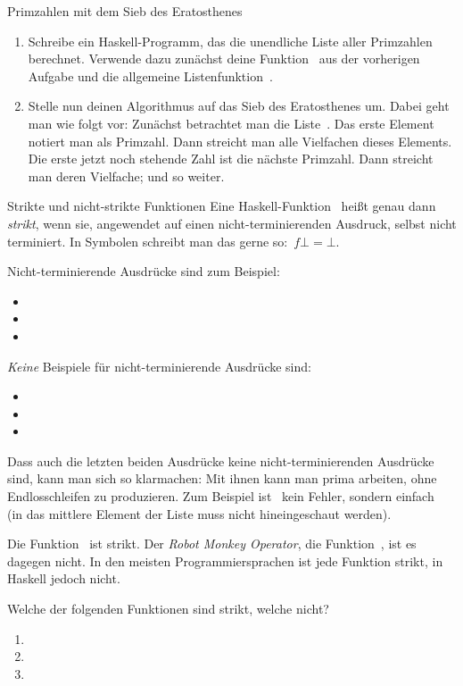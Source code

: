 \documentclass{uebblatt}
\begin{document}
\begin{aufgabe}{Primzahlen mit dem Sieb des Eratosthenes}
\begin{enumerate}
\item Schreibe ein Haskell-Programm, das die unendliche Liste aller Primzahlen
berechnet. Verwende dazu zunächst deine Funktion~ aus der vorherigen Aufgabe und die allgemeine
Listenfunktion~.
\item Stelle nun deinen Algorithmus auf das Sieb des Eratosthenes um. Dabei
geht man wie folgt vor: Zunächst betrachtet man die
Liste~\haskellinline{[2..]}. Das erste Element notiert man als Primzahl. Dann
streicht man alle Vielfachen dieses Elements. Die erste jetzt noch stehende
Zahl ist die nächste Primzahl. Dann streicht man deren Vielfache; und so
weiter.
\end{enumerate}
\end{aufgabe}

\begin{aufgabe}{Strikte und nicht-strikte Funktionen}
Eine Haskell-Funktion~ heißt genau dann
\emph{strikt}, wenn sie, angewendet auf einen nicht-terminierenden Ausdruck,
selbst nicht terminiert. In Symbolen schreibt man das gerne
so:~$f \bot = \bot$.

Nicht-terminierende Ausdrücke sind zum Beispiel:
\begin{itemize}
\item {}
\item {}
\item {}
\end{itemize}
\emph{Keine} Beispiele für nicht-terminierende Ausdrücke sind:
\begin{itemize}
\item {}
\item \haskellinline{[0..]}
\item \haskellinline{['a', undefined, 'b']}
\end{itemize}
Dass auch die letzten beiden Ausdrücke keine nicht-terminierenden Ausdrücke
sind, kann man sich so klarmachen: Mit ihnen kann man prima arbeiten, ohne
Endlosschleifen zu produzieren. Zum Beispiel ist~ kein Fehler, sondern einfach~ (in das
mittlere Element der Liste muss nicht hineingeschaut werden).

Die Funktion~ ist strikt.
Der \emph{Robot Monkey Operator}, die Funktion~, ist es dagegen nicht. In den meisten Programmiersprachen ist jede
Funktion strikt, in Haskell jedoch nicht.

Welche der folgenden Funktionen sind strikt, welche nicht?
\begin{enumerate}
\item {}
\item {}
\item {}
\end{enumerate}
\end{aufgabe}
\end{document}

